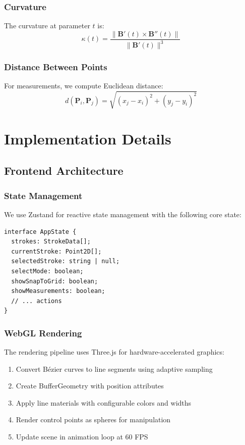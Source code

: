 \documentclass[12pt,a4paper]{article}
\begin{document}
\subsubsection{Curvature}

The curvature at parameter $t$ is:
\begin{equation}
\kappa(t) = \frac{\|\mathbf{B}'(t) \times \mathbf{B}''(t)\|}{\|\mathbf{B}'(t)\|^3}
\end{equation}

\subsubsection{Distance Between Points}

For measurements, we compute Euclidean distance:
\begin{equation}
d(\mathbf{P}_i, \mathbf{P}_j) = \sqrt{(x_j-x_i)^2 + (y_j-y_i)^2}
\end{equation}

\section{Implementation Details}

\subsection{Frontend Architecture}

\subsubsection{State Management}
We use Zustand for reactive state management with the following core state:
\begin{verbatim}
interface AppState {
  strokes: StrokeData[];
  currentStroke: Point2D[];
  selectedStroke: string | null;
  selectMode: boolean;
  showSnapToGrid: boolean;
  showMeasurements: boolean;
  // ... actions
}
\end{verbatim}

\subsubsection{WebGL Rendering}

The rendering pipeline uses Three.js for hardware-accelerated graphics:
\begin{enumerate}
    \item Convert Bézier curves to line segments using adaptive sampling
    \item Create BufferGeometry with position attributes
    \item Apply line materials with configurable colors and widths
    \item Render control points as spheres for manipulation
    \item Update scene in animation loop at 60 FPS
\end{enumerate}
\end{document}
